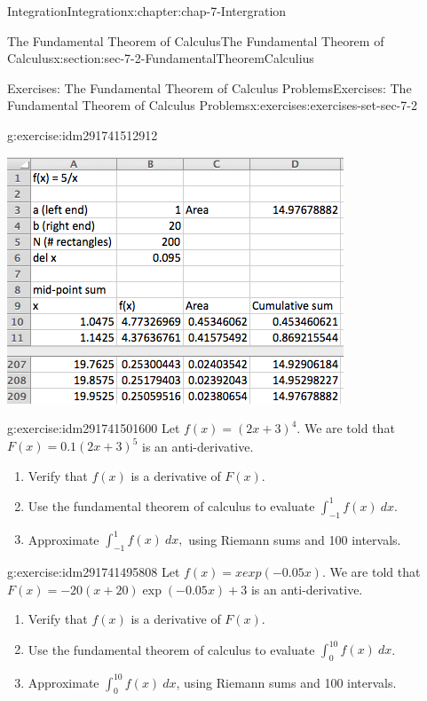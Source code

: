 \documentclass[oneside,10pt,]{book}
\numberwithin{equation}{section}
\begin{document}
\begin{chapterptx}{Integration}{}{Integration}{}{}{x:chapter:chap-7-Intergration}
\begin{sectionptx}{The Fundamental Theorem of Calculus}{}{The Fundamental Theorem of Calculus}{}{}{x:section:sec-7-2-FundamentalTheoremCalculius}
\begin{exercises-subsection}{Exercises: The Fundamental Theorem of Calculus Problems}{}{Exercises: The Fundamental Theorem of Calculus Problems}{}{}{x:exercises:exercises-set-sec-7-2}
\begin{divisionexercise}{3}{}{}{g:exercise:idm291741512912}
\begin{enumerate}[label=(\alph*)]
\begin{sidebyside}{1}{0.25}{0.25}{0}%
\begin{sbspanel}{0.5}%
\includegraphics[width=\linewidth]{images/sec7-2-sol3a.png}
\end{sbspanel}%
\end{sidebyside}%
\end{enumerate}
\end{divisionexercise}%
\begin{divisionexercise}{4}{}{}{g:exercise:idm291741501600}%
Let \(f(x) = (2 x +3)^4\).  We are told that \(F(x) = 0.1 (2 x + 3)^5\) is an anti-derivative.%
%
\begin{enumerate}[label=(\alph*)]
\item{}Verify that \(f(x)\) is a derivative of \(F(x)\).%
\item{}Use the fundamental theorem of calculus to evaluate \(\int_{-1}^1 f(x)\ dx\).%
\item{}Approximate \(\int_{-1}^1 f(x)\ dx,\) using Riemann sums and 100 intervals.%
\end{enumerate}
\end{divisionexercise}%
\begin{divisionexercise}{5}{}{}{g:exercise:idm291741495808}%
Let \(f(x) = x exp(-0.05 x)\).  We are told that \(F(x) = -20 (x+20) \exp(-0.05x)+3\) is an anti-derivative.%
%
\begin{enumerate}[label=(\alph*)]
\item{}Verify that \(f(x)\) is a derivative of \(F(x)\).%
\item{}Use the fundamental theorem of calculus to evaluate \(\int_0^{10} f(x)\ dx\).%
\item{}Approximate \(\int_0^{10} f(x)\ dx\), using Riemann sums and 100 intervals.%

\end{enumerate}
\end{divisionexercise}
\end{exercises-subsection}
\end{sectionptx}
\end{chapterptx}
\end{document}

